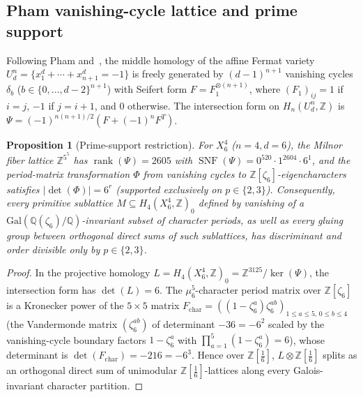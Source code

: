 \documentclass[11pt,a4paper]{amsart}
\newtheorem{proposition}[theorem]{Proposition}
\theoremstyle{definition}
\newcommand{\ZZ}{\mathbb{Z}}
\newcommand{\QQ}{\mathbb{Q}}
\newcommand{\SNF}{\operatorname{SNF}}
\newcommand{\rank}{\operatorname{rank}}
\begin{document}
\subsection{Pham vanishing-cycle lattice and prime support}
Following Pham and~\cite{AMVL19}, the middle homology of the affine Fermat variety $U_d^n = \{x_1^d + \cdots + x_{n+1}^d = -1\}$ is freely generated by $(d-1)^{n+1}$ vanishing cycles $\delta_b$ ($b \in \{0,\dots,d-2\}^{n+1}$) with Seifert form $F = F_1^{\otimes (n+1)}$, where $(F_1)_{ij} = 1$ if $i=j$, $-1$ if $j=i+1$, and $0$ otherwise. The intersection form on $H_n(U_d^n, \ZZ)$ is $\Psi = (-1)^{n(n+1)/2}(F + (-1)^n F^T)$.

\begin{proposition}[Prime-support restriction]\label{prop:prime-support}
For $X_6^4$ ($n=4, d=6$), the Milnor fiber lattice $\ZZ^{5^5}$ has $\rank(\Psi) = 2605$ with $\SNF(\Psi) = 0^{520}\cdot 1^{2604}\cdot 6^1$, and the period-matrix transformation $\Phi$ from vanishing cycles to $\ZZ[\zeta_6]$-eigencharacters satisfies $|\det(\Phi)| = 6^r$ (supported exclusively on $p \in \{2, 3\}$). Consequently, every primitive sublattice $M \subseteq H_4(X_6^4, \ZZ)_0$ defined by vanishing of a $\mathrm{Gal}(\QQ(\zeta_6)/\QQ)$-invariant subset of character periods, as well as every gluing group between orthogonal direct sums of such sublattices, has discriminant and order divisible only by $p \in \{2, 3\}$.
\end{proposition}
\begin{proof}
In the projective homology $L = H_4(X_6^4, \ZZ)_0 = \ZZ^{3125} / \ker(\Psi)$, the intersection form has $\det(L) = 6$. The $\mu_6^5$-character period matrix over $\ZZ[\zeta_6]$ is a Kronecker power of the $5 \times 5$ matrix $F_{\mathrm{char}} = ((1 - \zeta_6^a)\zeta_6^{a b})_{1 \le a \le 5,\, 0 \le b \le 4}$ (the Vandermonde matrix $(\zeta_6^{ab})$ of determinant $-36 = -6^2$ scaled by the vanishing-cycle boundary factors $1 - \zeta_6^a$ with $\prod_{a=1}^5 (1 - \zeta_6^a) = 6$), whose determinant is $\det(F_{\mathrm{char}}) = -216 = -6^3$. Hence over $\ZZ[\tfrac{1}{6}]$, $L \otimes \ZZ[\tfrac{1}{6}]$ splits as an orthogonal direct sum of unimodular $\ZZ[\tfrac{1}{6}]$-lattices along every Galois-invariant character partition.
\end{proof}
\end{document}
